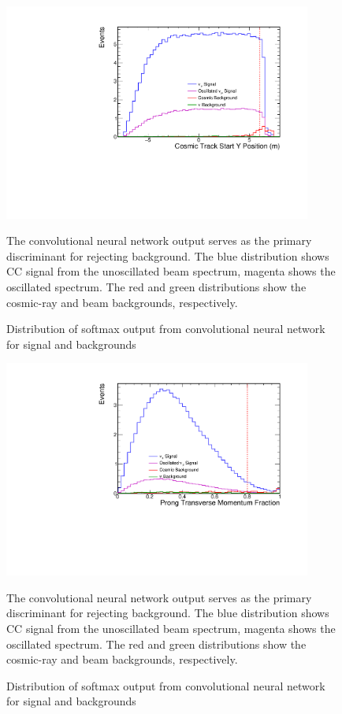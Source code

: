 \begin{figure}[t]
\begin{center}
\includegraphics[width=0.9\textwidth]{figures/selection/n1_cosStartY.pdf}
\end{center}
\caption{Distribution of softmax output from convolutional neural network for signal and backgrounds}{
The convolutional neural network output serves as the primary discriminant for
rejecting background.
The blue distribution shows \numu CC signal from the unoscillated beam spectrum,
magenta shows the oscillated spectrum.
The red and green distributions show the cosmic-ray and beam backgrounds,
respectively.
}
\label{cosStartY}
\end{figure}
\begin{figure}[t]
\begin{center}
\includegraphics[width=0.9\textwidth]{figures/selection/n1_pngptp.pdf}
\end{center}
\caption{Distribution of softmax output from convolutional neural network for signal and backgrounds}{
The convolutional neural network output serves as the primary discriminant for
rejecting background.
The blue distribution shows \numu CC signal from the unoscillated beam spectrum,
magenta shows the oscillated spectrum.
The red and green distributions show the cosmic-ray and beam backgrounds,
respectively.
}
\label{pngptp}
\end{figure}
